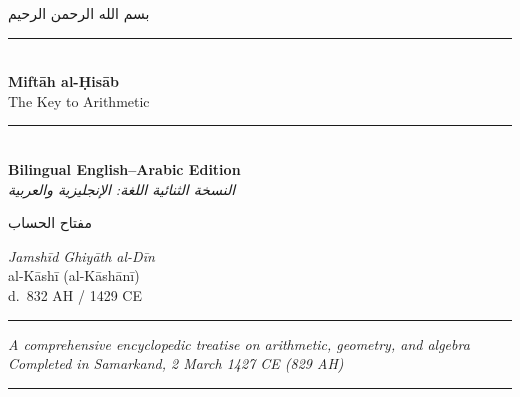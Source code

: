 \documentclass[11pt,a4paper]{article}
\newcommand{\longline}{\noindent\rule{\textwidth}{0.4pt}}
\newcommand{\shortline}{\noindent\rule{0.5\textwidth}{0.4pt}\par}
\newcommand{\ar}[1]{\arabicfont\beginR #1\endR}
\newcommand{\arbf}[1]{\arabicfontbf\beginR #1\endR}
\newenvironment{arabicbox}{%
  \begin{framed}
  \begin{minipage}{\linewidth-2\fboxsep-2\fboxrule}
  \setlength{\parindent}{0pt}
  \linespread{1.3}\selectfont
}{%
  \end{minipage}
  \end{framed}
}
\begin{document}
\thispagestyle{empty}
\begin{center}
\vspace*{1.5cm}

{\fontsize{14}{16}\selectfont\ar{بسم الله الرحمن الرحيم}}\\[0.8cm]

{\color{rulecolor}\longline}\\[0.6cm]

{\fontsize{28}{34}\selectfont\bfseries\color{titlecolor}
Mift\=ah al-\d{H}is\=ab}\\[0.5cm]
{\fontsize{18}{22}\selectfont\color{sectioncolor}
The Key to Arithmetic}\\[0.3cm]
{\color{rulecolor}\longline}\\[0.8cm]

{\Large\textbf{Bilingual English--Arabic Edition}}\\[0.3cm]
{\large\textit{النسخة الثنائية اللغة: الإنجليزية والعربية}}\\[1cm]

\begin{arabicbox}
\begin{center}
{\Large\arbf{مفتاح الحساب}}
\end{center}
\end{arabicbox}

\vspace{0.8cm}

{\Large\textit{Jamsh\=id Ghiy\=ath al-D\=in}}\\[0.3cm]
{\large al-K\=ash\=i (al-K\=ash\=an\=i)}\\[0.2cm]
{\normalsize d.\ 832 AH / 1429 CE}\\[1cm]

{\color{rulecolor}\shortline}

\vspace{0.5cm}

{\small\textit{A comprehensive encyclopedic treatise on arithmetic, geometry, and algebra}}\\[0.2cm]
{\small\textit{Completed in Samarkand, 2 March 1427 CE (829 AH)}}\\[0.5cm]

{\color{rulecolor}\longline}\\[0.8cm]


\end{center}
\end{document}
